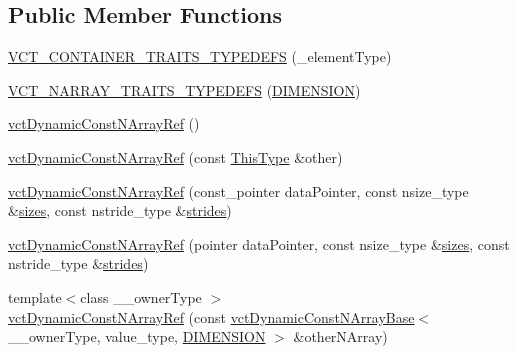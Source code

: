\subsection*{Public Member Functions}
\begin{DoxyCompactItemize}
\item 
\hyperlink{classvct_dynamic_const_n_array_ref_ad45282f3ed5ad001342d2e2d392fccba}{V\-C\-T\-\_\-\-C\-O\-N\-T\-A\-I\-N\-E\-R\-\_\-\-T\-R\-A\-I\-T\-S\-\_\-\-T\-Y\-P\-E\-D\-E\-F\-S} (\-\_\-element\-Type)
\item 
\hyperlink{classvct_dynamic_const_n_array_ref_afa2332eb9460f2452334228dfa5e0d97}{V\-C\-T\-\_\-\-N\-A\-R\-R\-A\-Y\-\_\-\-T\-R\-A\-I\-T\-S\-\_\-\-T\-Y\-P\-E\-D\-E\-F\-S} (\hyperlink{classvct_dynamic_const_n_array_ref_ae8d52484153d181fd3ac08be58589848ae003ed9f88ed51f50c6c180506995b93}{D\-I\-M\-E\-N\-S\-I\-O\-N})
\item 
\hyperlink{classvct_dynamic_const_n_array_ref_a8f377039414e0da661472068f1117d01}{vct\-Dynamic\-Const\-N\-Array\-Ref} ()
\item 
\hyperlink{classvct_dynamic_const_n_array_ref_ad88779e4c59e02b0ded5eee8ee9da598}{vct\-Dynamic\-Const\-N\-Array\-Ref} (const \hyperlink{classvct_dynamic_const_n_array_ref_aa156bc5f7cf482d155b45f75c59a3c72}{This\-Type} \&other)
\item 
\hyperlink{classvct_dynamic_const_n_array_ref_a880140c2248e8a95408e9f3bed610cd9}{vct\-Dynamic\-Const\-N\-Array\-Ref} (const\-\_\-pointer data\-Pointer, const nsize\-\_\-type \&\hyperlink{classvct_dynamic_const_n_array_base_aa86793343d80325ba5671bc24a2e0e8f}{sizes}, const nstride\-\_\-type \&\hyperlink{classvct_dynamic_const_n_array_base_a6608baee60a448ccb9598417c487cde2}{strides})
\item 
\hyperlink{classvct_dynamic_const_n_array_ref_a9bb789e4bafc2aed17c9d26b1c60ce0d}{vct\-Dynamic\-Const\-N\-Array\-Ref} (pointer data\-Pointer, const nsize\-\_\-type \&\hyperlink{classvct_dynamic_const_n_array_base_aa86793343d80325ba5671bc24a2e0e8f}{sizes}, const nstride\-\_\-type \&\hyperlink{classvct_dynamic_const_n_array_base_a6608baee60a448ccb9598417c487cde2}{strides})
\item 
{\footnotesize template$<$class \-\_\-\-\_\-owner\-Type $>$ }\\\hyperlink{classvct_dynamic_const_n_array_ref_a7d4185ac0554df97f941adcc87d7b172}{vct\-Dynamic\-Const\-N\-Array\-Ref} (const \hyperlink{classvct_dynamic_const_n_array_base}{vct\-Dynamic\-Const\-N\-Array\-Base}$<$ \-\_\-\-\_\-owner\-Type, value\-\_\-type, \hyperlink{classvct_dynamic_const_n_array_ref_ae8d52484153d181fd3ac08be58589848ae003ed9f88ed51f50c6c180506995b93}{D\-I\-M\-E\-N\-S\-I\-O\-N} $>$ \&other\-N\-Array)

\end{DoxyCompactItemize}
